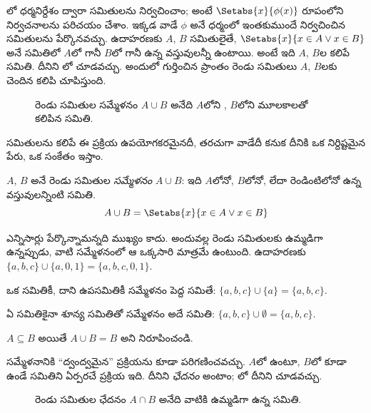 \documentclass[../../../include/open-logic-section]{subfiles}
\begin{document}

\begin{explain}
లో ధర్మనిర్దేశం ద్వారా సమితులను
నిర్వచించాం; అంటే $\Setabs{x}{\phi(x)}$ రూపంలోని నిర్వచనాలను
పరిచయం చేశాం. ఇక్కడ వాడే $\phi$ అనే ధర్మంలో ఇంతకుముందే
నిర్వచించిన సమితులను పేర్కొనవచ్చు. ఉదాహరణకు $A$, $B$ సమితులైతే,
$\Setabs{x}{x \in A \lor x \in B}$ అనే సమితిలో $A$లో గానీ
$B$లో గానీ  ఉన్న వస్తువులన్నీ ఉంటాయి.
అంటే ఇది $A$, $B$ల  కలిపే సమితి.
దీనిని లో చూడవచ్చు. అందులో గుర్తించిన ప్రాంతం
రెండు సమితులు $A$, $B$లకు చెందిన 
కలిపి చూపిస్తుంది.

\begin{figure}
  \caption{రెండు సమితుల సమ్మేళనం $A \cup B$ అనేది $A$లోని
  , $B$లోని మూలకాలతో కలిపిన సమితి.}
\end{figure}

సమితులను కలిపే ఈ ప్రక్రియ ఉపయోగకరమైనదీ, తరచుగా వాడేదీ కనుక
దీనికి ఒక నిర్దిష్టమైన పేరు, ఒక సంకేతం ఇస్తాం.
\end{explain}

\begin{defn}[సమ్మేళనం]
$A$, $B$ అనే రెండు సమితుల \emph{సమ్మేళనం} $A \cup B$:
ఇది $A$లోనో, $B$లోనో, లేదా రెండింటిలోనో  ఉన్న
వస్తువులన్నింటి సమితి.
\[
A \cup B = \Setabs{x}{x \in A \lor x \in B}
\]
\end{defn}

\begin{ex}
 ఎన్నిసార్లు పేర్కొన్నామన్నది ముఖ్యం కాదు.
అందువల్ల రెండు సమితులకు ఉమ్మడిగా  ఉన్నప్పుడు,
వాటి సమ్మేళనంలో ఆ  ఒక్కసారి మాత్రమే ఉంటుంది.
ఉదాహరణకు $\{ a, b, c\} \cup \{ a, 0, 1\} = \{a, b, c, 0, 1\}$.

ఒక సమితికీ, దాని ఉపసమితికీ సమ్మేళనం పెద్ద సమితే:
$\{a, b, c \} \cup \{a \} = \{a, b, c\}$.

ఏ సమితికైనా శూన్య సమితితో సమ్మేళనం అదే సమితి:
$\{a, b, c \} \cup \emptyset = \{a, b, c \}$.
\end{ex}

\begin{prob}
$A \subseteq B$ అయితే $A \cup B = B$ అని నిరూపించండి.
\end{prob}

\begin{explain}
సమ్మేళనానికి ``ద్వంద్వమైన'' ప్రక్రియను కూడా పరిగణించవచ్చు.
$A$లో  ఉంటూ, $B$లో కూడా  ఉండే
 సమితిని ఏర్పరచే ప్రక్రియ ఇది.
దీనిని \emph{ఛేదనం} అంటాం; లో దీనిని చూడవచ్చు.
\begin{figure}
  \caption{రెండు సమితుల ఛేదనం $A \cap B$ అనేది వాటికి ఉమ్మడిగా
    ఉన్న  సమితి.}
\end{figure}
\end{explain}
\end{document}
